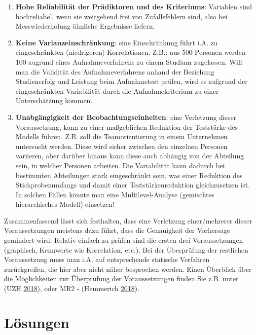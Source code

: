 \documentclass[]{article}
\providecommand{\tightlist}{%
  \setlength{\itemsep}{0pt}\setlength{\parskip}{0pt}}
\begin{document}
\begin{enumerate}
\def\labelenumi{\arabic{enumi}.}
\setcounter{enumi}{6}
\tightlist
\item
  \textbf{Hohe Reliabilität der Prädiktoren und des Kriteriums}:
  Variablen sind hochreliabel, wenn sie weitgehend frei von
  Zufallsfehlern sind, also bei Messwiederholung ähnliche Ergebnisse
  liefern.
\item
  \textbf{Keine Varianzeinschränkung}: eine Einschränkung führt i.A. zu
  eingeschränkten (niedrigeren) Korrelationen. Z.B.: aus 500 Personen
  werden 100 augrund eines Aufnahmeverfahrens zu einem Studium
  zugelassen. Will man die Validität des Aufnahmeverfahrens anhand der
  Beziehung Studienerfolg und Leistung beim Aufnahmetest prüfen, wird es
  aufgrund der eingeschränkten Variabilität durch die Aufnahmekriterium
  zu einer Unterschätzung kommen.
\item
  \textbf{Unabgängigkeit der Beobachtungseinheiten}: eine Verletzung
  dieser Voraussetzung, kann zu einer maßgeblichen Reduktion der
  Teststärke des Modells führen. Z.B. soll die Teamorientierung in einem
  Unternehmen untersucht werden. Diese wird sicher zwischen den
  einzelnen Personen variieren, aber darüber hinaus kann diese auch
  abhängig von der Abteilung sein, in welcher Personen arbeiten. Die
  Variabilität kann dadurch bei bestimmten Abteilungen stark
  eingeschränkt sein, was einer Reduktion des Stichprobenumfangs und
  damit einer Teststärkenreduktion gleichzusetzen ist. In solchen Fällen
  könnte man eine Multilevel-Analyse (gemischtes hierarchisches Modell)
  einsetzen!
\end{enumerate}

Zusammenfassend lässt sich festhalten, dass eine Verletzung
einer/mehrerer dieser Voraussetzungen meistens dazu führt, dass die
Genauigkeit der Vorhersage gemindert wird. Relativ einfach zu prüfen
sind die ersten drei Voraussetzungen (graphisch, Kennwerte wie
Korrelation, etc.). Bei der Überprüfung der restlichen Voraussetzung
muss man i.A. auf entsprechende statische Verfahren zurückgreifen, die
hier aber nicht näher besprochen werden. Einen Überblick über die
Möglichkeiten zur Überprüfung der Voraussetzungen finden Sie z.B. unter
(UZH \protect\hyperlink{ref-UZH}{2018}), oder MR2 - (Hemmerich
\protect\hyperlink{ref-Hemmerich}{2018}).

\section*{Lösungen}\label{losungen-1}
\end{document}
